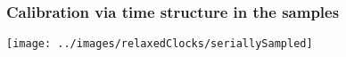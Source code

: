 \begin{frame}
\frametitle{Calibration via time structure in the samples}

\texttt{[image: ../images/relaxedClocks/seriallySampled]}

\end{frame}